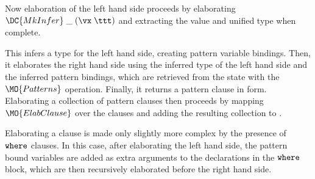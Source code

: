 
Now elaboration of the left hand side proceeds by elaborating $\DC{MkInfer}\;\_\;(\vx\;\ttt)$ and
extracting the value and unified type when complete.


This infers a type for the left hand side, creating pattern variable bindings. Then, 
it elaborates the right hand side using the inferred type of the left hand side
and the inferred pattern bindings, which are retrieved from the state with the
$\MO{Patterns}$ operation. Finally, it returns a pattern clause in \TT{} form.
Elaborating a collection of pattern clauses then proceeds by mapping $\MO{ElabClause}$ over
the clauses and adding the resulting collection to \TT{}.


Elaborating a clause is made only slightly more complex by the presence of
$\mathtt{where}$ clauses. In this case, after elaborating the left hand side, the pattern
bound variables are added as extra arguments to the declarations in the $\mathtt{where}$ block,
which are then recursively elaborated before the right hand side.


